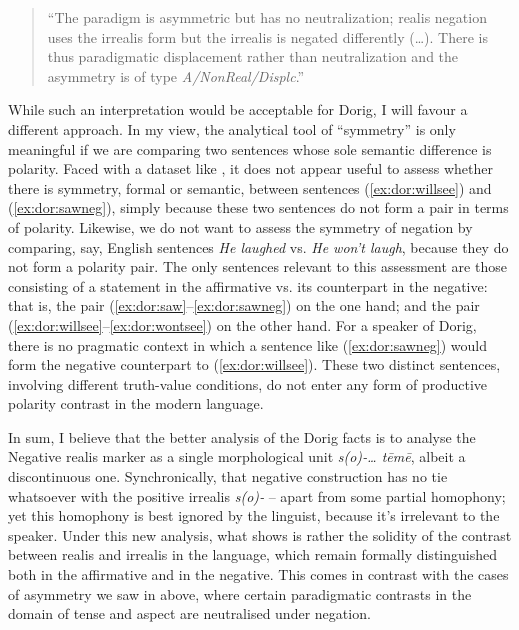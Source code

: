 \documentclass[output=paper,colorlinks,citecolor=brown,draft]{langscibook}
\begin{document}
\begin{quote}
    “The paradigm is asymmetric but has no neutralization; realis negation uses the irrealis form but the irrealis is negated differently (…). There is thus paradigmatic displacement rather than neutralization and the asymmetry is of type \textit{A/NonReal/Displc}.”
\end{quote}

While such an interpretation would be acceptable for Dorig, I will favour a different approach. In my view, the analytical tool of “symmetry” is only meaningful if we are comparing two sentences whose sole semantic difference is polarity. Faced with a dataset like , it does not appear useful to assess whether there is symmetry, formal or semantic, between sentences (\ref{ex:dor:willsee}) and (\ref{ex:dor:sawneg}), simply because these two sentences do not form a pair in terms of polarity. Likewise, we do not want to assess the symmetry of negation by comparing, say, English sentences \textit{He laughed} vs. \textit{He won’t laugh}, because they do not form a polarity pair. The only sentences relevant to this assessment are those consisting of a statement in the affirmative vs. its counterpart in the negative: that is, the pair (\ref{ex:dor:saw}--\ref{ex:dor:sawneg}) on the one hand; and the pair (\ref{ex:dor:willsee}--\ref{ex:dor:wontsee}) on the other hand. For a speaker of Dorig, there is no pragmatic context in which a sentence like (\ref{ex:dor:sawneg}) would form the negative counterpart to (\ref{ex:dor:willsee}). These two distinct sentences, involving different truth-value conditions, do not enter any form of productive polarity contrast in the \mbox{modern} language. 

In sum, I believe that the better analysis of the Dorig facts is to analyse the Negative realis marker as a single morphological unit \textit{s(o)‑… tēmē}, albeit a discontinuous one. Synchronically, that negative construction has no tie whatsoever with the positive irrealis \textit{s(o)‑} – apart from some partial homophony; yet this homophony is best ignored by the linguist, because it’s irrelevant to the speaker. Under this new analysis, what  shows is rather the solidity of the contrast between realis and irrealis in the language, which remain formally distinguished both in the affirmative and in the negative. This comes in contrast with the cases of asymmetry we saw in  above, where certain paradigmatic contrasts in the domain of tense and aspect are neutralised under negation. 
\end{document}
